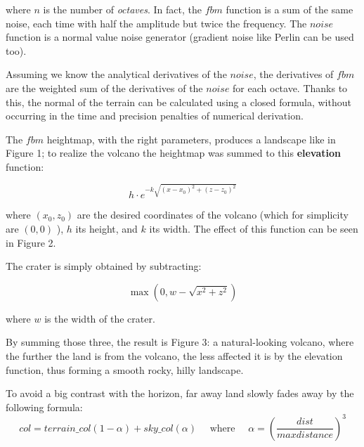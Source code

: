 \documentclass[a4paper,10pt]{article} %
\renewcommand{\b}[1]{%
    {\textbf{#1}}}
\begin{document}
where $n$ is the number of \emph{octaves}. In fact, the $fbm$ function is a sum of the same noise, each time with half the amplitude but twice the 
frequency. The $noise$ function is a normal value noise generator (gradient noise like Perlin can be used too). 

Assuming we know the analytical derivatives
of the $noise$, the derivatives of $fbm$ are the weighted sum of the derivatives of the $noise$ for each octave.
Thanks to this, the normal of the terrain can be calculated using a closed formula, without occurring in the time and precision penalties of numerical
derivation.

The $fbm$ heightmap, with the right parameters,  produces a landscape like in Figure 1; to realize the volcano the heightmap was summed to this 
\b{elevation} function:

\[
   h \cdot e^{-k \sqrt{(x - x_0)^2 + (z - z_0)^2}} 
\]

where $(x_0, z_0)$ are the desired coordinates of the volcano (which for simplicity are $(0,0)$ ), $h$ its height, and $k$ its width. The effect of this function can be seen in Figure 2.

The crater is simply obtained by subtracting:

\[
    \max(0, w - \sqrt{x^2 + z^2})
\]

where $w$ is the width of the crater.

By summing those three, the result is Figure 3: a natural-looking volcano, where the further the land is from the volcano, the less affected
it is by the elevation function, thus forming a smooth rocky, hilly landscape.

\vspace{2em}

To avoid a big contrast with the horizon, far away land slowly fades away by the following formula:
\[
    col = terrain\_col (1 - \alpha) + sky\_col (\alpha) \quad \text{ where } \quad \alpha = \left(\frac{dist}{maxdistance}\right) ^ 3 
\]



\end{document}
